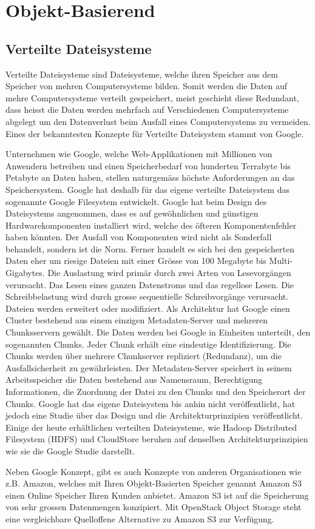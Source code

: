 \section{Objekt-Basierend}

\subsection{Verteilte Dateisysteme}
Verteilte Dateisysteme sind Dateisysteme, welche ihren Speicher aus dem Speicher von mehren Computersysteme bilden. Somit werden die Daten auf mehre Computersysteme verteilt gespeichert, meist geschieht diese Redundant, dass heisst die Daten werden mehrfach auf Verschiedenen Computersysteme abgelegt um den Datenverlust beim Ausfall eines Computersystems zu vermeiden. Eines der bekanntesten Konzepte für Verteilte Dateisystem stammt von Google.

Unternehmen wie Google, welche Web-Applikationen mit Millionen von Anwendern betreiben und einen Speicherbedarf von hunderten Terrabyte bis Petabyte an Daten haben, stellen naturgemäss höchste Anforderungen an das Speichersystem. Google hat deshalb für das eigene verteilte Dateisystem das sogenannte Google Filesystem entwickelt. Google hat beim Design des Dateisystems angenommen, dass es auf gewöhnlichen und günstigen Hardwarekomponenten installiert wird, welche des öfteren Komponentenfehler haben könnten. Der Ausfall von Komponenten wird nicht als Sonderfall behandelt, sondern ist die Norm. Ferner handelt es sich bei den gespeicherten Daten eher um riesige Dateien mit einer Grösse von 100 Megabyte bis Multi-Gigabytes. Die Auslastung wird primär durch zwei Arten von Lesevorgängen verursacht. Das Lesen eines ganzen Datenstroms und das regellose Lesen. Die Schreibbelastung wird durch grosse sequentielle Schreibvorgänge verursacht. Dateien werden erweitert oder modifiziert. Als Architektur hat Google einen Cluster bestehend aus einem einzigen Metadaten-Server und mehreren Chunksservern gewählt. Die Daten werden bei Google in Einheiten unterteilt, den sogenannten Chunks. Jeder Chunk erhält eine eindeutige Identifizierung. Die Chunks werden über mehrere Chunkserver repliziert (Redundanz), um die Ausfallsicherheit zu gewährleisten. Der Metadaten-Server speichert in seinem Arbeitsspeicher die Daten bestehend aus Namensraum, Berechtigung Informationen, die Zuordnung der Datei zu den Chunks und den Speicherort der Chunks. Google hat das eigene Dateisystem bis anhin nicht veröffentlicht, hat jedoch eine Studie über das Design und die Architekturprinzipien veröffentlicht. Einige der heute erhältlichen verteilten Dateisysteme, wie Hadoop Distributed Filesystem (HDFS) und CloudStore beruhen auf denselben Architekturprinzipien wie sie die Google Studie darstellt. \cite{Ghemawat2003}\cite{Across2008}\cite{Rao2011} 

Neben Google Konzept, gibt es auch Konzepte von anderen Organisationen wie z.B. Amazon, welches mit Ihren Objekt-Basierten Speicher genannt Amazon S3 einen Online Speicher Ihren Kunden anbietet. Amazon S3 ist auf die Speicherung von sehr grossen Datenmengen konzipiert. Mit OpenStack Object Storage steht eine vergleichbare Quelloffene Alternative zu Amazon S3 zur Verfügung.
